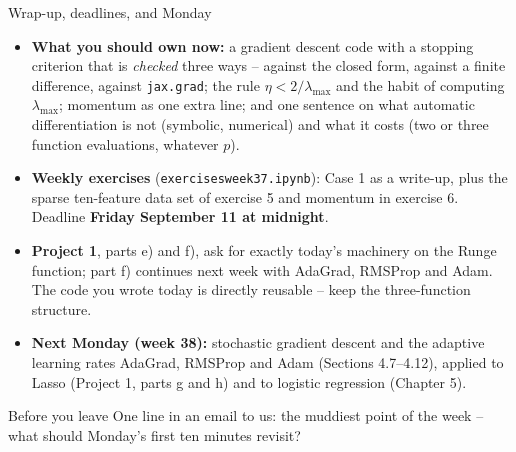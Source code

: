 \documentclass[10pt,aspectratio=169]{beamer}
\begin{document}
\begin{frame}{Wrap-up, deadlines, and Monday}
\begin{itemize}
  \item \textbf{What you should own now:} a gradient descent code with a
        stopping criterion that is \emph{checked} three ways -- against the
        closed form, against a finite difference, against \texttt{jax.grad};
        the rule $\eta<2/\lambda_{\max}$ and the habit of computing
        $\lambda_{\max}$; momentum as one extra line; and one sentence on
        what automatic differentiation is not (symbolic, numerical) and what
        it costs (two or three function evaluations, whatever $p$).
  \item \textbf{Weekly exercises} (\texttt{exercisesweek37.ipynb}): Case 1
        as a write-up, plus the sparse ten-feature data set of exercise 5 and
        momentum in exercise 6.  Deadline \textbf{Friday September 11 at
        midnight}.
  \item \textbf{Project 1}, parts e) and f), ask for exactly today's
        machinery on the Runge function; part f) continues next week with
        AdaGrad, RMSProp and Adam.  The code you wrote today is directly
        reusable -- keep the three-function structure.
  \item \textbf{Next Monday (week 38):} stochastic gradient descent and the
        adaptive learning rates AdaGrad, RMSProp and Adam (Sections
        4.7--4.12), applied to Lasso (Project 1, parts g and h) and to
        logistic regression (Chapter 5).
\end{itemize}
\begin{block}{Before you leave}
One line in an email to us: the muddiest point of the week -- what should
Monday's first ten minutes revisit?
\end{block}
\end{frame}
\end{document}
